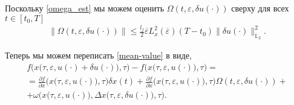 \documentclass[../main.tex]{subfiles}
\begin{document}
Поскольку \eqref{omega_est} мы можем оценить $\Omega(t,\varepsilon, \delta u(\cdot)) $ сверху для всех $t \in [t_0, T]$
\begin{gather}
    \| \Omega(t,\varepsilon, \delta u(\cdot))\| \leqslant \frac{l_f}{2} \overline{\varepsilon} L_x^2(\overline{\varepsilon})(T-t_0)\|\delta u(\cdot)\|_{\mathbb{L}_2}^2.
\end{gather}

Теперь мы можем переписать \eqref{mean-value} в виде,  
\begin{gather*}
    f\Big(x\big(\tau,\varepsilon, u(\cdot) + \delta u(\cdot)\big),\tau\Big) -
    f\Big(x\big(\tau,\varepsilon, u(\cdot)\big),\tau\Big) = \\ =
    \frac{\partial f}{\partial x}  \Big(x\big(\tau,\varepsilon, u(\cdot)\big), \tau\Big) \delta x(t) + 
    \frac{\partial f}{\partial x} \Big(x\big(\tau,\varepsilon, u(\cdot)\big), \tau\Big) \Omega(t,\varepsilon, \delta u(\cdot))
    + \\ + 
    \omega\Big(x\big(\tau,\varepsilon, u(\cdot)\big),\Delta x\big(\tau, \varepsilon, \delta u(\cdot)\big),\tau\Big).
\end{gather*}
\end{document}

